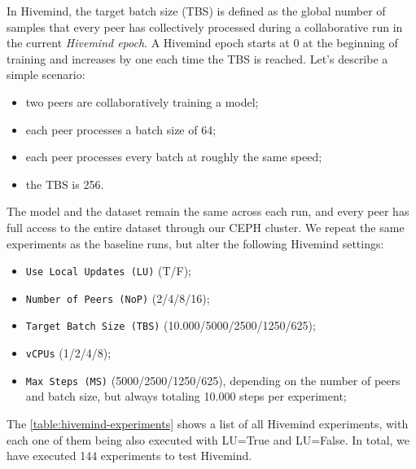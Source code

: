 In Hivemind, the target batch size (TBS) is defined as the global number of samples that every peer has collectively processed during a collaborative run in the current \textit{Hivemind epoch}.
A Hivemind epoch starts at 0 at the beginning of training and increases by one each time the TBS is reached.
Let's describe a simple scenario:
\begin{itemize}
    \item two peers are collaboratively training a model;
    \item each peer processes a batch size of 64;
    \item each peer processes every batch at roughly the same speed;
    \item the TBS is 256.
\end{itemize}

The model and the dataset remain the same across each run, and every peer has full access to the entire dataset through our CEPH cluster.
We repeat the same experiments as the baseline runs, but alter the following Hivemind settings:
\begin{itemize}
    \item \texttt{Use Local Updates (LU)} (T/F);
    \item \texttt{Number of Peers (NoP)} (2/4/8/16);
    \item \texttt{Target Batch Size (TBS)} (10.000/5000/2500/1250/625);
    \item \texttt{vCPUs} (1/2/4/8);
    \item \texttt{Max Steps (MS)} (5000/2500/1250/625), depending on the number of peers and batch size, but always totaling 10.000 steps per experiment;
\end{itemize}

The \autoref{table:hivemind-experiments} shows a list of all Hivemind experiments, with each one of them being also executed with LU=True and LU=False.
In total, we have executed 144 experiments to test Hivemind.

